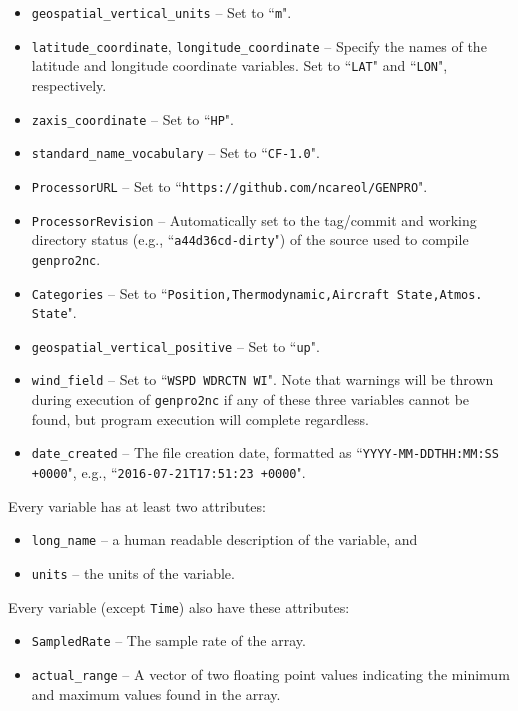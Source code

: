 \documentclass{report}
\begin{document}
\begin{itemize}[noitemsep]
	\item \texttt{geospatial\_vertical\_units} -- Set to ``\texttt{m}".
	\item \texttt{latitude\_coordinate}, \texttt{longitude\_coordinate} -- Specify the names of the latitude and longitude coordinate variables. Set to ``\texttt{LAT}" and ``\texttt{LON}", respectively.
	\item \texttt{zaxis\_coordinate} -- Set to ``\texttt{HP}".
	\item \texttt{standard\_name\_vocabulary} -- Set to ``\texttt{CF-1.0}".
	\item \texttt{ProcessorURL} -- Set to ``\texttt{https://github.com/ncareol/GENPRO}".
	\item \texttt{ProcessorRevision} -- Automatically set to the tag/commit and working directory status (e.g., \linebreak ``\texttt{a44d36cd-dirty}") of the source used to compile \texttt{genpro2nc}.
	\item \texttt{Categories} -- Set to ``\texttt{Position,Thermodynamic,Aircraft State,Atmos. State}".
	\item \texttt{geospatial\_vertical\_positive} -- Set to ``\texttt{up}".
	\item \texttt{wind\_field} -- Set to ``\texttt{WSPD WDRCTN WI}". Note that warnings will be thrown during execution of \texttt{genpro2nc} if any of these three variables cannot be found, but program execution will complete regardless.
	\item \texttt{date\_created} -- The file creation date, formatted as ``\texttt{YYYY-MM-DDTHH:MM:SS +0000}", e.g., \linebreak ``\texttt{2016-07-21T17:51:23 +0000}".
\end{itemize}

Every variable has at least two attributes:
\begin{itemize}[noitemsep]
	\item \texttt{long\_name} -- a human readable description of the variable, and
	\item \texttt{units} -- the units of the variable.
\end{itemize}

Every variable (except \texttt{Time}) also have these attributes:
\begin{itemize}[noitemsep]
	\item \texttt{SampledRate} -- The sample rate of the array.
	\item \texttt{actual\_range} -- A vector of two floating point values indicating the minimum and maximum values found in the array.
\end{itemize}
\end{document}
